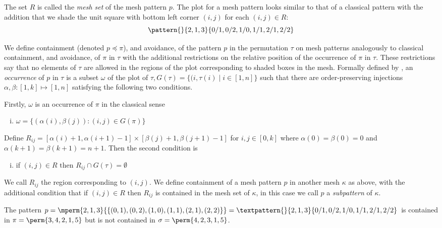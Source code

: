 The set \(R\) is called the \emph{mesh set} of the mesh pattern \(p\).
The plot for a mesh pattern looks similar to that of a classical pattern with the
addition that we shade the unit square with bottom left corner \((i,j)\) for each \((i,j) \in R\):
\begin{equation*}
    \pattern{}{ 2, 1, 3 }{ 0/1, 0/2, 1/0, 1/1, 2/1, 2/2 }
\end{equation*}

We define containment (denoted \(p\preceq \pi\)), and avoidance, of the pattern \(p\) in the permutation
\(\tau\) on mesh patterns analogously to classical containment, and avoidance,
of \(\pi\) in \(\tau\) with the additional restrictions on the relative
position of the occurrence of \(\pi\) in \(\tau\). These restrictions say that
no elements of \(\tau\) are allowed in the regions of the plot corresponding
to shaded boxes in the mesh. Formally defined by \textcite{journals/combinatorics/BrandenC11},
an \emph{occurrence} of \(p\) in \(\tau\) is a subset \(\omega\) of the plot of
\(\tau, G(\tau) = \{(i,\tau(i)\mid i\in[1,n]\}\) such that there are order-preserving
injections \(\alpha,\beta:[1,k]\mapsto[1,n]\) satisfying the following two conditions.

\noindent Firstly, \(\omega\) is an occurrence of \(\pi\) in the classical sense
  \begin{enumerate}[i.]
    \item \(\omega = \{(\alpha(i),\beta(j)):(i,j)\in G(\pi)\}\)
  \end{enumerate}\saveenum
  Define \(R_{ij} = [\alpha(i)+1,\alpha(i+1)-1]\times[\beta(j)+1,\beta(j+1)-1]\)
   for \(i,j\in[0,k]\) where \(\alpha(0)=\beta(0)=0\) and \(\alpha(k+1)=\beta(k+1)=n+1\). Then
   the second condition is
  \begin{enumerate}[i.]\resetenum
  \item if \((i,j) \in R \text{ then } R_{ij} \cap G(\tau) = \emptyset\)
\end{enumerate}
We call \(R_{ij}\) the region corresponding to \((i,j)\).
We define containment of a mesh pattern \(p\) in another mesh \(\kappa\) as above,
with the additional condition that if \((i,j)\in R\text{ then } R_{ij}\) is
contained in the mesh set of \(\kappa\), in this case we call \(p\) a \emph{subpattern}
of \(\kappa\).

\begin{example}
    The pattern \(p=\mperm{2,1,3}{\{(0,1),(0,2),(1,0),(1,1),(2,1),(2,2)\}}=
    \textpattern{}{ 2, 1, 3 }{ 0/1, 0/2, 1/0, 1/1, 2/1, 2/2 }\) is contained in
    \(\pi = \perm{3,4,2,1,5}\) but is not contained in \(\sigma = \perm{4,2,3,1,5}\).
\end{example}

